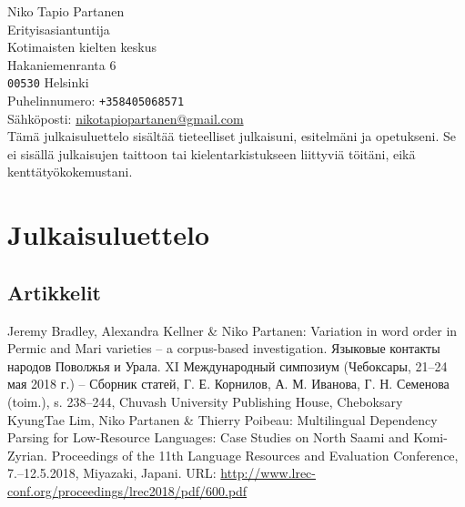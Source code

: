 \documentclass[11pt, a4paper]{article}
\newcommand{\years}[1]{\marginnote{\scriptsize #1}} %
\begin{document}

{\LARGE Niko Tapio Partanen}\\[1cm] %
Erityisasiantuntija\\
Kotimaisten kielten keskus\\
Hakaniemenranta 6\\
\texttt{00530} Helsinki \\[.2cm]
Puhelinnumero: \texttt{+358405068571}\\ %
Sähköposti: \href{mailto:nikotapiopartanen@gmail.com}{nikotapiopartanen@gmail.com}\\ %


Tämä julkaisuluettelo sisältää tieteelliset julkaisuni, esitelmäni ja opetukseni. Se ei sisällä julkaisujen taittoon tai kielentarkistukseen liittyviä töitäni, eikä kenttätyökokemustani.

\section*{Julkaisuluettelo}

\subsection*{Artikkelit}

\years{2018} Jeremy Bradley, Alexandra Kellner \& Niko Partanen: Variation in word order in Permic and Mari varieties – a corpus-based investigation. Языковые контакты народов Поволжья и Урала. XI Международный симпозиум (Чебоксары, 21–24 мая 2018 г.) – Сборник статей, Г. Е. Корнилов, А. М. Иванова, Г. Н. Семенова (toim.), s. 238–244, Chuvash University Publishing House, Cheboksary\\

\years{2018} KyungTae Lim, Niko Partanen \& Thierry Poibeau: Multilingual Dependency Parsing for Low-Resource Languages: Case Studies on North Saami and Komi-Zyrian. Proceedings of the 11th Language Resources and Evaluation Conference, 7.--12.5.2018, Miyazaki, Japani. URL: \url{http://www.lrec-conf.org/proceedings/lrec2018/pdf/600.pdf}\\
\end{document}
